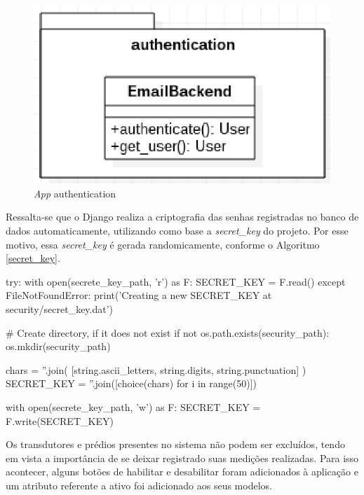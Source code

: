 \begin{figure}[!h]
    \centering
    \includegraphics[keepaspectratio=true,scale=0.8]{figuras/authentication.eps}
    \caption{\textit{App} authentication}
    \label{authentication}
\end{figure}

Ressalta-se que o Django realiza a criptografia das senhas registradas no banco de dados automaticamente, utilizando como base a \textit{secret\_key} do projeto. Por esse motivo, essa \textit{secret\_key} é gerada randomicamente, conforme o Algoritmo \ref{secret_key}.

\begin{python}[caption={Criação automática da \textit{secret\_key} do projeto.}, captionpos=b,label={secret_key}]
try:
    with open(secrete_key_path, 'r') as F:
        SECRET_KEY = F.read()
except FileNotFoundError:
    print('Creating a new SECRET_KEY at security/secret_key.dat')

    # Create directory, if it does not exist
    if not os.path.exists(security_path):
        os.mkdir(security_path)

    chars = ''.join(
        [string.ascii_letters, string.digits, string.punctuation]
    )
    SECRET_KEY = ''.join([choice(chars) for i in range(50)])

    with open(secrete_key_path, 'w') as F:
        SECRET_KEY = F.write(SECRET_KEY)
\end{python}

Os transdutores e prédios presentes no sistema não podem ser excluídos, tendo em vista a importância de se deixar registrado suas medições realizadas. Para isso acontecer, alguns botões de habilitar e desabilitar foram adicionados à aplicação e um atributo referente a ativo foi adicionado aos seus modelos.

